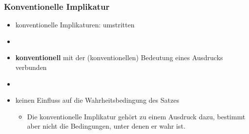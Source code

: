 \begin{frame}
\frametitle{Konventionelle Implikatur}

\begin{itemize}
	\item konventionelle Implikaturen: umstritten
	\item[]
	\item \textbf{konventionell} \ras mit der (konventionellen) Bedeutung eines Ausdrucks verbunden
	\item[]
	\item keinen Einfluss auf die Wahrheitsbedingung des Satzes
	
	\begin{itemize}
	\item Die konventionelle Implikatur gehört zu einem Ausdruck dazu, bestimmt aber nicht die Bedingungen, unter denen er wahr ist.
	\end{itemize}
	
\end{itemize}

\end{frame}



